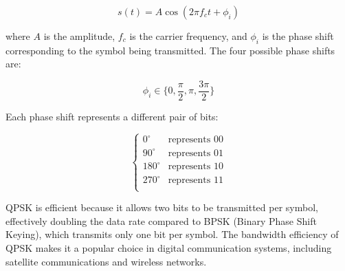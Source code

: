 \[
s(t) = A \cos(2\pi f_c t + \phi_i)
\]

where \( A \) is the amplitude, \( f_c \) is the carrier frequency, and \( \phi_i \) is the phase shift corresponding to the symbol being transmitted. The four possible phase shifts are:

\[
\phi_i \in \{0, \frac{\pi}{2}, \pi, \frac{3\pi}{2}\}
\]

Each phase shift represents a different pair of bits:

\[
\begin{cases}
0^\circ & \text{represents } 00 \\
90^\circ & \text{represents } 01 \\
180^\circ & \text{represents } 10 \\
270^\circ & \text{represents } 11 \\
\end{cases}
\]

QPSK is efficient because it allows two bits to be transmitted per symbol, effectively doubling the data rate compared to BPSK (Binary Phase Shift Keying), which transmits only one bit per symbol. The bandwidth efficiency of QPSK makes it a popular choice in digital communication systems, including satellite communications and wireless networks.

